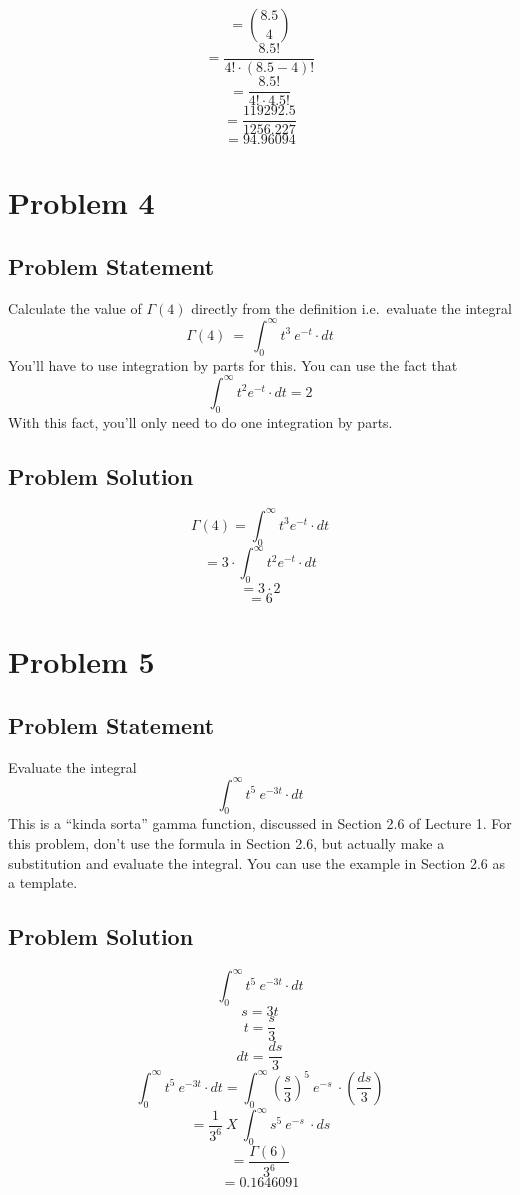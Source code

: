 \documentclass[12pt]{article}
\theoremstyle{definition}
\begin{document}
$$ = { 8.5 \choose 4} $$
$$ = \frac{8.5!}{4! \cdot (8.5 - 4)!}$$
$$ = \frac{8.5!}{4! \cdot 4.5!} $$
$$ = \frac{119292.5 }{ 1256.227 } $$
$$ = 94.96094 $$



\newpage
\section*{Problem 4}

\subsection*{Problem Statement}

Calculate the value of $\Gamma(4)$ directly from the definition i.e.\ evaluate the integral
$$
\Gamma(4)\ =\ \int_0^\infty t^3\ e^{-t} \cdot dt
$$
You'll have to use integration by parts for this. You can use the fact that
$$
\int_0^\infty t^2 e^{-t} \cdot dt = 2
$$
With this fact, you'll only need to do one integration by parts.


\subsection*{Problem Solution}

$$ \Gamma (4) = \int_0^\infty t^3 e^{-t} \cdot dt $$
$$ = 3 \cdot \int_0^\infty t^2 e^{-t} \cdot dt $$
$$ = 3 \cdot 2 $$
$$ = 6 $$


\newpage
\section*{Problem 5}

\subsection*{Problem Statement}

Evaluate the integral
$$
\int_0^\infty t^5\ e^{-3t} \cdot dt
$$
This is a ``kinda sorta'' gamma function, discussed in Section 2.6 of Lecture 1. For this problem, don't use the formula in Section 2.6, but actually make a substitution and evaluate the integral. You can use the example in Section 2.6 as a template.



\subsection*{Problem Solution}

$$ \int_0^\infty t^5\ e^{-3t} \cdot dt $$
$$ s = 3t $$
$$ t = \frac{s}{3} $$
$$ dt = \frac{ds}{3} $$
$$ \int_0^\infty t^5\ e^{-3t} \cdot dt =  \int_0^\infty (\frac{s}{3})^5 \ e^{-s} \ \cdot (\frac{ds}{3}) $$
$$ = \frac{1}{3^6} \ X \ \int_0^\infty s^5  \ e^{-s} \ \cdot ds $$
$$ = \frac{\Gamma (6)}{3^6} $$
$$ = 0.1646091 $$
\end{document}
